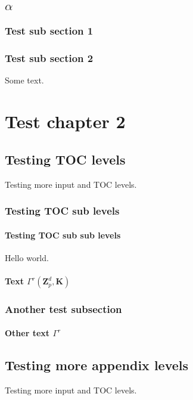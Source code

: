 \documentclass{book}
\begin{document}
\section{$\alpha$}

\subsection{Test sub section 1}

\subsection{Test sub section 2}
Some text.

\chapter{Test chapter 2}

\section{Testing TOC levels}
Testing more input and TOC levels.

\subsection{Testing TOC sub levels}

\subsubsection{Testing TOC sub sub levels}
Hello world.

\subsubsection{Text $\Gamma^{r}(\ensuremath{{\mathbf{Z}}}_p^d,\mathbf{K})$}

\subsection{Another test subsection}

\subsubsection{Other text $\Gamma^{r}$}

\section{Testing more appendix levels}
Testing more input and TOC levels.
\end{document}
